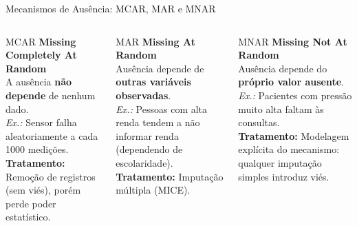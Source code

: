 \documentclass[aspectratio=169]{beamer}
\begin{document}
\begin{frame}{Mecanismos de Ausência: MCAR, MAR e MNAR}
    \begin{columns}[T]
        \begin{block}{\color{mineblue} MCAR}
            \textbf{Missing Completely At Random}\\[0.3em]
            \small A ausência \textbf{não depende} de nenhum dado.\\[0.3em]
            \textit{Ex.:} Sensor falha aleatoriamente a cada 1000 medições.\\[0.3em]
            \footnotesize \textbf{Tratamento:} Remoção de registros (sem viés), porém perde poder estatístico.
        \end{block}

        \begin{block}{\color{mineorange} MAR}
            \textbf{Missing At Random}\\[0.3em]
            \small Ausência depende de \textbf{outras variáveis observadas}.\\[0.3em]
            \textit{Ex.:} Pessoas com alta renda tendem a não informar renda (dependendo de escolaridade).\\[0.3em]
            \footnotesize \textbf{Tratamento:} Imputação múltipla (MICE).
        \end{block}

        \begin{block}{\color{minered} MNAR}
            \textbf{Missing Not At Random}\\[0.3em]
            \small Ausência depende do \textbf{próprio valor ausente}.\\[0.3em]
            \textit{Ex.:} Pacientes com pressão muito alta faltam às consultas.\\[0.3em]
            \footnotesize \textbf{Tratamento:} Modelagem explícita do mecanismo: qualquer imputação simples introduz viés.
        \end{block}
    \end{columns}
\end{frame}
\end{document}
